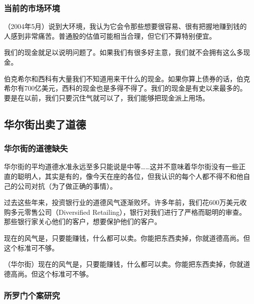 \subsubsection*{当前的市场环境}

（2004年5月）说到大环境，我认为它会令那些想要很容易、很有把握地赚到钱的人感到非常痛苦。普通股的估值可能相当合理，但它们不算特别便宜。
\par

我们的现金就足以说明问题了。如果我们有很多好主意，我们就不会拥有这么多现金。
\par

伯克希尔和西科有大量我们不知道用来干什么的现金。如果你算上债券的话，伯克希尔有700亿美元，西科的现金也是多得不得了。我们的现金是有史以来最多的。要是在以前，我们只要沉住气就可以了，我们能够把现金派上用场。
\par

\subsection*{华尔街出卖了道德}

\subsubsection*{华尔街的道德缺失}

华尔街的平均道德水准永远至多只能说是中等……这并不意味着华尔街没有一些正直的聪明人，其实是有的，像今天在座的各位，但我认识的每个人都不得不和他自己的公司对抗（为了做正确的事情）。
\par

过去这些年来，投资银行业的道德风气逐渐败坏。许多年前，我们花600万美元收购多元零售公司（Diversified Retailing），银行对我们进行了严格而聪明的审查。那些银行家关心他们的客户，想要保护他们的客户。
\par

现在的风气是，只要能赚钱，什么都可以卖。你能把东西卖掉，你就道德高尚。但这个标准可不够。
\par

\begin{WisdomBox}
\par

（华尔街）现在的风气是，只要能赚钱，什么都可以卖。你能把东西卖掉，你就道德高尚。但这个标准可不够。
\par
\end{WisdomBox}

\subsubsection*{所罗门个案研究}

